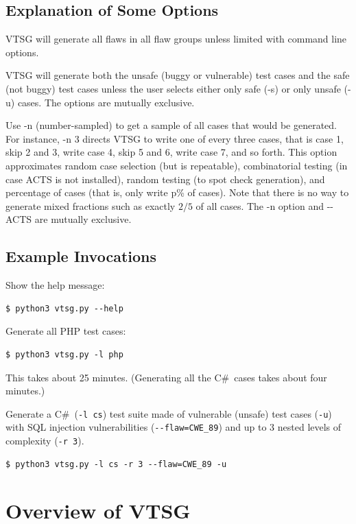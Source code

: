 \documentclass[12pt]{article}
\newcommand{\CSharp}{C{\fontseries{b}\selectfont\#}}
\newcommand{\zws}{\hspace{0pt}}
\begin{document}
\subsection{Explanation of Some Options}

VTSG will generate all flaws in all flaw groups unless limited with
command line options.

VTSG will generate both the unsafe (buggy or vulnerable)
test cases and the safe (not buggy) test cases unless the user selects
either only safe (-s) or only unsafe (-u) cases.  The options are
mutually exclusive.

Use -n (number-sampled) to get a sample of all cases that would be generated.
For instance, -n 3 directs VTSG to write one of every three cases, that is case
1, skip 2 and 3, write case
4, skip 5 and 6, write case 7, and so forth.  This option approximates random
case selection (but is repeatable), combinatorial testing (in case ACTS is not
installed), random testing (to spot check generation), and percentage of cases
(that is, only write p\% of cases).  Note that there is no way to generate mixed
fractions such as exactly $2/5$ of all cases.  The -n option and -\zws-ACTS are
mutually exclusive.

\subsection{Example Invocations}

Show the help message:
\begin{verbatim}
$ python3 vtsg.py --help
\end{verbatim}

Generate all PHP test cases:
\begin{verbatim}
$ python3 vtsg.py -l php
\end{verbatim}

This takes about 25 minutes.  (Generating all the \CSharp\ cases takes about four
minutes.)

Generate a \CSharp\ (\verb|-l cs|) test suite made of vulnerable (unsafe) test
cases (\verb|-u|) with SQL injection vulnerabilities (\verb|--flaw=CWE_89|)
and up to 3 nested levels of complexity (\verb|-r 3|).
\begin{verbatim}
$ python3 vtsg.py -l cs -r 3 --flaw=CWE_89 -u
\end{verbatim}
 
\section{Overview of VTSG}
\end{document}
